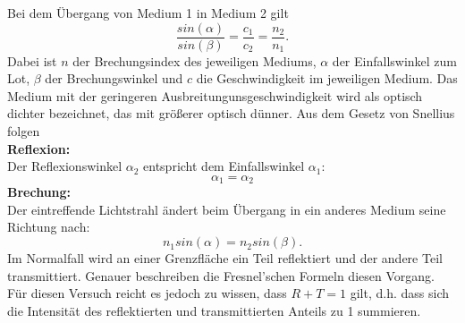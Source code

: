Bei dem Übergang von Medium 1 in Medium 2 gilt
\begin{equation}\label{eq:Brechungsgesetz}
    \frac{sin(\alpha)}{sin(\beta)} = \frac{c_1}{c_2} = \frac{n_2}{n_1}.
\end{equation}
Dabei ist $n$ der Brechungsindex des jeweiligen Mediums, $\alpha$ der Einfallswinkel zum Lot, $\beta$ der Brechungswinkel und $c$ die Geschwindigkeit im jeweiligen Medium.
Das Medium mit der geringeren Ausbreitungunsgeschwindigkeit wird als optisch dichter  bezeichnet, das mit größerer optisch dünner. 
Aus dem Gesetz von Snellius folgen\\
\textbf{Reflexion:}\\
Der Reflexionswinkel $\alpha_2$ entspricht dem Einfallswinkel $\alpha_1$:
\begin{equation*}
    \alpha_1 = \alpha_2
\end{equation*}
\textbf{Brechung:}\\
Der eintreffende Lichtstrahl ändert beim Übergang in ein anderes Medium seine Richtung nach:
\begin{equation*}
    n_1 sin(\alpha) = n_2 sin(\beta).
\end{equation*}
Im Normalfall wird an einer Grenzfläche ein Teil reflektiert und der andere Teil transmittiert. Genauer beschreiben die Fresnel'schen Formeln diesen Vorgang.
Für diesen Versuch reicht es jedoch zu wissen, dass $R + T = 1$ gilt, d.h. dass sich die Intensität des reflektierten und transmittierten Anteils zu 1 summieren.
